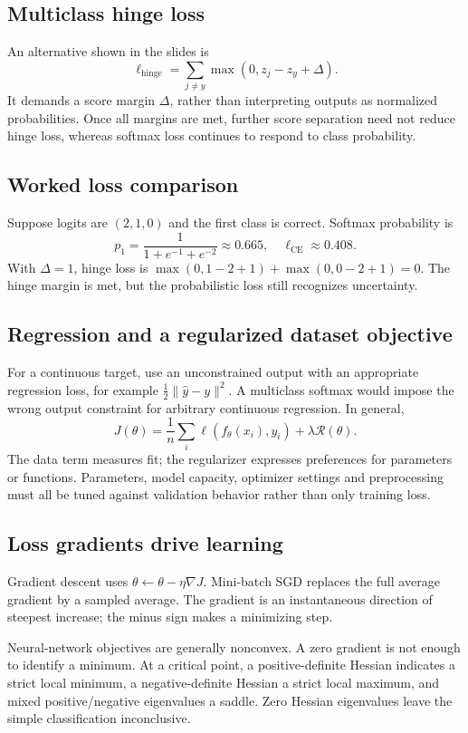 \documentclass[11pt]{article}
\begin{document}
\subsection{Multiclass hinge loss}
An alternative shown in the slides is
\[
\ell_{\mathrm{hinge}}=\sum_{j\ne y}\max(0,z_j-z_y+\Delta).
\]
It demands a score margin $\Delta$, rather than interpreting outputs as normalized probabilities. Once all margins are met, further score separation need not reduce hinge loss, whereas softmax loss continues to respond to class probability.
\subsection{Worked loss comparison}
Suppose logits are $(2,1,0)$ and the first class is correct. Softmax probability is
\[
p_1=\frac1{1+e^{-1}+e^{-2}}\approx0.665,
\quad \ell_{\mathrm{CE}}\approx0.408.
\]
With $\Delta=1$, hinge loss is $\max(0,1-2+1)+\max(0,0-2+1)=0$. The hinge margin is met, but the probabilistic loss still recognizes uncertainty.
\subsection{Regression and a regularized dataset objective}
For a continuous target, use an unconstrained output with an appropriate regression loss, for example $\tfrac12\|\hat y-y\|^2$. A multiclass softmax would impose the wrong output constraint for arbitrary continuous regression. In general,
\[
J(\theta)=\frac1n\sum_i\ell(f_\theta(x_i),y_i)+\lambda\mathcal R(\theta).
\]
The data term measures fit; the regularizer expresses preferences for parameters or functions. Parameters, model capacity, optimizer settings and preprocessing must all be tuned against validation behavior rather than only training loss.
\subsection{Loss gradients drive learning}
Gradient descent uses $\theta\leftarrow\theta-\eta\nabla J$. Mini-batch SGD replaces the full average gradient by a sampled average. The gradient is an instantaneous direction of steepest increase; the minus sign makes a minimizing step.

Neural-network objectives are generally nonconvex. A zero gradient is not enough to identify a minimum. At a critical point, a positive-definite Hessian indicates a strict local minimum, a negative-definite Hessian a strict local maximum, and mixed positive/negative eigenvalues a saddle. Zero Hessian eigenvalues leave the simple classification inconclusive.
\end{document}
